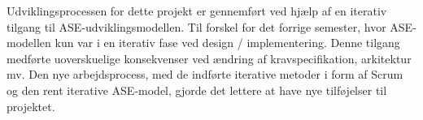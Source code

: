 \documentclass[Rapport/Rapport_main.tex]{subfiles}
\begin{document}
Udviklingsprocessen for dette projekt er gennemført ved hjælp af en iterativ tilgang til ASE-udviklingsmodellen. Til forskel for det forrige semester, hvor ASE-modellen kun var i en iterativ fase ved design / implementering. Denne tilgang medførte uoverskuelige konsekvenser ved ændring af kravspecifikation, arkitektur mv. Den nye arbejdsprocess, med de indførte iterative metoder i form af Scrum og den rent iterative ASE-model, gjorde det lettere at have nye tilføjelser til projektet.  
\end{document}
